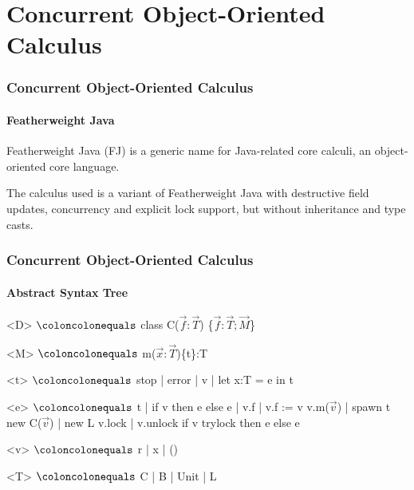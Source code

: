 \section{Concurrent Object-Oriented Calculus}

\begin{frame}
\frametitle{Concurrent Object-Oriented Calculus}
\framesubtitle{Featherweight Java}

\begin{definition}
Featherweight Java (FJ) is a generic name for Java-related core calculi, an object-oriented core language.
\end{definition}

The calculus used is a variant of Featherweight Java with destructive field updates, concurrency and explicit lock support, but without inheritance and type casts.
\end{frame}

\begin{frame}
\frametitle{Concurrent Object-Oriented Calculus}
\framesubtitle{Abstract Syntax Tree}
\begin{center}
  \begin{minipage}{0.8\linewidth}
    \begin{grammar}
    <D> $\coloncolonequals$ class C($\vec{f}:\vec{T}$) \{$\vec{f}:\vec{T}; \vec{M}$\}

    <M> $\coloncolonequals$ m($\vec{x}:\vec{T}$)\{t\}:T
    
    <t> $\coloncolonequals$ stop | error | v | let x:T = e in t 
    
    <e> $\coloncolonequals$ t | if v then e else e | v.f | v.f := v 
        \indalt v.m($\vec{v}$) | spawn t
        \indalt new C($\vec{v}$) | new L 
        \indalt v.lock | v.unlock
        \indalt if v trylock then e else e 
    
    <v> $\coloncolonequals$ r | x | () 
    
    <T> $\coloncolonequals$ C | B | Unit | L
    \end{grammar}
  \end{minipage}
\end{center}
\end{frame}


